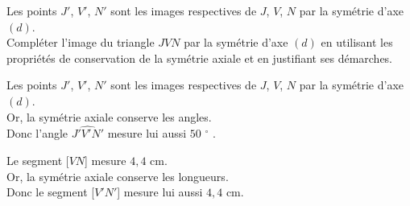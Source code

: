 \begin{Exemple}
 Les points $J'$, $V'$, $N'$ sont les images respectives de $J$, $V$, $N$ par la symétrie d'axe $(d)$.\\Compléter l'image du triangle $JVN$ par la symétrie d'axe $(d)$ en utilisant les propriétés de conservation de la symétrie axiale et en justifiant ses démarches.\\
 \begin{minipage}[c]{0.5\textwidth}
 Les points $J'$, $V'$, $N'$ sont les images respectives de $J$, $V$, $N$ par la symétrie d'axe $(d)$.\\Or, la symétrie axiale conserve les angles.\\Donc l'angle $\widehat{J'V'N'}$ mesure lui aussi $50$ $^\circ$ .

\medskip
Le segment [$VN$] mesure $4{,}4\text{ cm}$.\\Or, la symétrie axiale conserve les longueurs.\\Donc le segment [$V'N'$] mesure lui aussi $4{,}4\text{ cm}$.

 \end{minipage} \hfill  \begin{minipage}[c]{0.5\textwidth}
 \begin{center}
 \begin{tikzpicture}[baseline,scale=0.4,transform shape]


\end{tikzpicture}
\end{center}
\end{minipage}
\end{Exemple}
